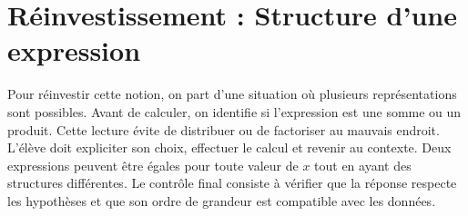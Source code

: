 \section{Réinvestissement : Structure d’une expression}
Pour réinvestir cette notion, on part d’une situation où plusieurs représentations sont possibles. Avant de calculer, on identifie si l’expression est une somme ou un produit. Cette lecture évite de distribuer ou de factoriser au mauvais endroit. L’élève doit expliciter son choix, effectuer le calcul et revenir au contexte. Deux expressions peuvent être égales pour toute valeur de $x$ tout en ayant des structures différentes. Le contrôle final consiste à vérifier que la réponse respecte les hypothèses et que son ordre de grandeur est compatible avec les données.
